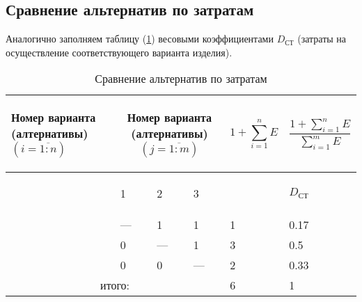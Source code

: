 \subsection{Сравнение альтернатив по затратам}
Аналогично заполняем таблицу (\ref{costs_lvl_comparison_table}) весовыми
коэффициентами $D_\text{СТ}$ (затраты на осуществление соответствующего варианта
изделия).
\begin{table}[h!]
    \centering
    \begin{tabular}{|p{2.4cm}|p{2cm}|p{2cm}|p{2cm}|p{2cm}|p{2cm}|}
        \hline
        \begin{center} Номер варианта (алтернативы) $(i = \overline{1:n})$ \end{center} &
        \multicolumn{3}{c|}{
            \parbox{2.4cm}{
                \centering
                Номер варианта (алтернативы) $(j = \overline{1:m})$
            }
        } &
        \begin{center} $$1 + \sum_{i=1}^n E$$ \end{center} &
        \begin{center} $$\frac{1 + \sum_{i=1}^n E}{\sum_{i=1}^m E}$$ \end{center} \\

        \hline &
        \begin{center} 1 \end{center} &
        \begin{center} 2 \end{center} &
        \begin{center} 3 \end{center} &
        &
        \begin{center} $D_\text{СТ}$ \end{center}\\

        \hline
        \centering{1} & --- &  1  &  1  & 1 & 0.17 \\ \hline
        \centering{2} &  0  & --- &  1  & 3 & 0.5  \\ \hline
        \centering{3} &  0  &  0  & --- & 2 & 0.33 \\ \hline

        \hline
        \multicolumn{4}{|c|}{итого:} & 6 & 1 \\
        \hline
    \end{tabular}
    \caption{Сравнение альтернатив по затратам}
    \label{costs_lvl_comparison_table}
\end{table}

